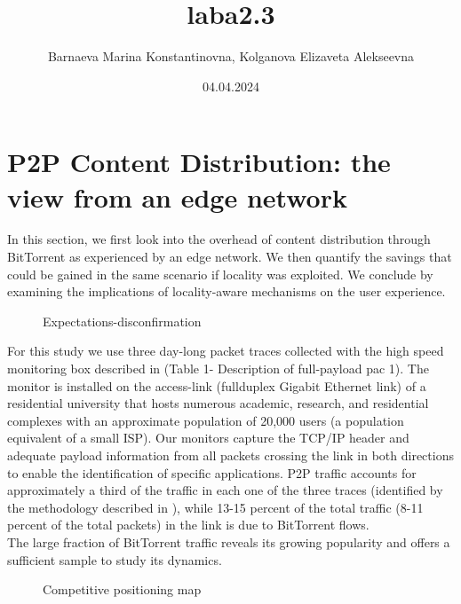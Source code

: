 \documentclass[12pt]{ilu}
\begin{document}
\begin{titlepage}
\title{laba2.3}
\author{Barnaeva Marina Konstantinovna, Kolganova Elizaveta Alekseevna}
\date{04.04.2024}
\maketitle %
\thispagestyle{empty}
\end{titlepage}


\tableofcontents
\newpage
\section{P2P Content Distribution: the view from an edge network}

In this section, we first look into the overhead of content distribution through BitTorrent as experienced by an edge network. We then quantify the savings that could be gained in the same scenario if locality was exploited. We conclude by examining the implications of locality-aware mechanisms on the user experience.\\


\begin{figure}[h] 
\caption{Expectations-disconfirmation}
\end{figure}
For this study we use three day-long packet traces collected with the high speed monitoring box described in  (Table 1- Description of full-payload pac 1). The monitor is installed on the access-link (fullduplex Gigabit Ethernet link) of a residential university that hosts numerous academic, research, and residential complexes with an approximate population of 20,000 users (a population equivalent of a small ISP). Our monitors capture the TCP/IP header and adequate payload information from all packets crossing the link in both directions to enable the identification of specific applications. P2P traffic accounts for approximately a third of the traffic in each one of the three traces (identified by the methodology described in ), while 13-15 percent of the total traffic (8-11 percent of the total packets) in the link is due to BitTorrent flows.\\

The large fraction of BitTorrent traffic reveals its growing popularity and offers a sufficient sample to study its dynamics. \\

\begin{figure}[H]
\caption{Competitive positioning map}
\end{figure}
\end{document}
